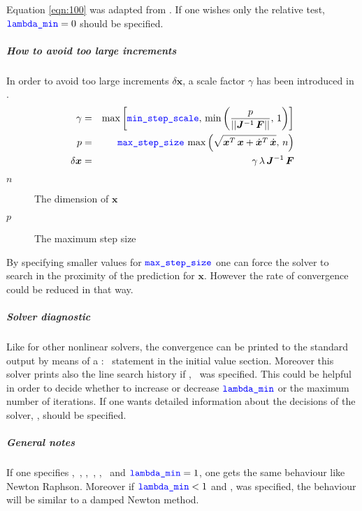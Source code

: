 Equation \ref{eqn:100} was adapted from \cite{NUMERICAL-RECIPES-IN-C}.
If one wishes only the relative test, $\textcolor{blue}{\texttt{lambda\_min}}=0$ should be specified.

\subparagraph{How to avoid too large increments}
In order to avoid too large increments $\delta\boldsymbol{x}$, a scale factor $\gamma$ has been introduced in \cite{NUMERICAL-RECIPES-IN-C}.
\begin{eqnarray}
\gamma &=& \max{\left[\textcolor{blue}{\texttt{min\_step\_scale}}, \, \min{\left(\frac{p}{\left|\left| \boldsymbol{J}^{-1} \, \boldsymbol{F} \right|\right|},\, 1\right)}\right]} \\ \nonumber
p &=& \textcolor{blue}{\texttt{max\_step\_size}} \, \max{\left(\sqrt{\boldsymbol{x}^T\,\boldsymbol{x} + \dot{\boldsymbol{x}}^T\,\dot{\boldsymbol{x}}},\, n\right)} \\ \nonumber
\delta\boldsymbol{x}&=&\gamma\,\lambda\,\boldsymbol{J}^{-1}\,\boldsymbol{F}
\end{eqnarray}

\begin{description}
\item[$n$] The dimension of $\boldsymbol{x}$
\item[$p$] The maximum step size
\end{description}

By specifying smaller values for $\textcolor{blue}{\texttt{max\_step\_size}}$ one can force the solver to search in the proximity of the prediction for $\boldsymbol{x}$. However the rate of convergence could be reduced in that way.

\subparagraph{Solver diagnostic}
Like for other nonlinear solvers, the convergence can be printed to the standard output by means of a :~ statement in the initial value section. Moreover this solver prints also the line search history if ,~ was specified. This could be helpful in order to decide whether to increase or decrease $\textcolor{blue}{\texttt{lambda\_min}}$ or the maximum number of iterations. If one wants detailed information about the decisions of the solver, ,  should be specified.

\subparagraph{General notes}
If one specifies ,~, ,~, ,~ and $\textcolor{blue}{\texttt{lambda\_min}}=1$, one gets the same behaviour like Newton Raphson. Moreover if $\textcolor{blue}{\texttt{lambda\_min}}<1$ and ,  was specified, the behaviour will be similar to a damped Newton method.




